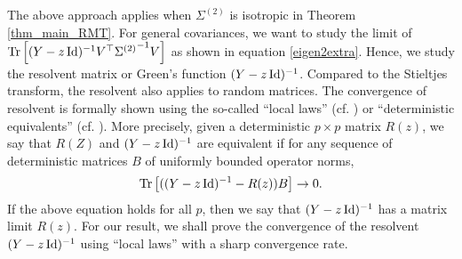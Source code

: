 The above approach applies when $\Sigma^{(2)}$ is isotropic in Theorem \ref{thm_main_RMT}.
For general covariances, we want to study the limit of $\operatorname{Tr}\left[ (Y - z\operatorname{Id})^{-1}V^{\top}{\Sigma^{(2)}}^{-1}V \right]$ as shown in equation \eqref{eigen2extra}.
Hence, we study the resolvent matrix or Green's function $(Y-z\operatorname{Id})^{-1}$.
Compared to the Stieltjes transform, the resolvent also applies to random matrices.
The convergence of resolvent is formally shown using the so-called ``local laws'' (cf. \cite{isotropic,erdos2017dynamical,Anisotropic}) or ``deterministic equivalents'' (cf. \cite{Hachem2007deterministic,DS18}).
More precisely, given a deterministic $p\times p$ matrix $R(z)$, we say that $R(Z)$ and $(Y-z\operatorname{Id})^{-1}$ are equivalent if for any sequence of deterministic matrices $B$ of uniformly bounded operator norms,
$$\operatorname{Tr}\left[((Y-z\operatorname{Id})^{-1}-R(z))B\right]\to 0.$$
If the above equation holds for all $p$, then we say that $(Y-z\operatorname{Id})^{-1}$ has a matrix limit $R(z)$.
For our result, we shall prove the convergence of the resolvent $(Y-z\operatorname{Id})^{-1}$ using ``local laws'' with a sharp convergence rate.

